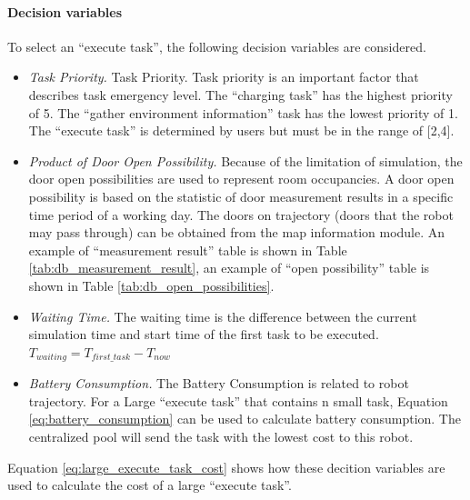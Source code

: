 \paragraph*{Decision variables}
To select an ``execute task'', the following decision variables are considered.
\begin{itemize}
\item \textsl{Task Priority.} Task Priority. Task priority is an important factor that describes task emergency level. The ``charging task'' has the highest priority of 5. The ``gather environment information'' task has the lowest priority of 1. 
	The ``execute task'' is determined by users but must be in the range of [2,4]. 
\item \textsl{Product of Door Open Possibility.} Because of the limitation of simulation, the door open possibilities are used to represent room occupancies. A door open possibility is based on the statistic of door measurement results in a specific time period of a working day. 
	The doors on trajectory (doors that the robot may pass through) can be obtained from the map information module.
	An example of ``measurement result'' table is shown in Table \ref{tab:db_measurement_result}, an example of ``open possibility'' table is shown in Table \ref{tab:db_open_possibilities}. 
\item \textsl{Waiting Time. } The waiting time is the difference between the current simulation time and start time of the first task to be executed. $T_{waiting} = T_{first\_task} - T_{now}$
\item \textsl{Battery Consumption.} The Battery Consumption is related to robot trajectory. For a Large ``execute task'' that contains n small task, Equation \ref{eq:battery_consumption} can be used to calculate battery consumption. The centralized pool will send the task with the lowest cost to this robot.

\end{itemize}

Equation \ref{eq:large_execute_task_cost} shows how these decition variables are used to calculate the cost of a large ``execute task''.

